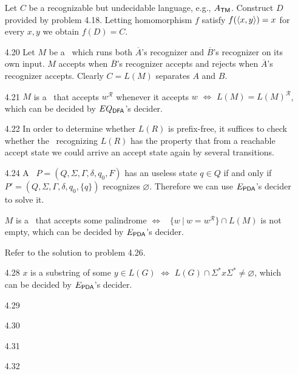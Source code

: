\begin{itemize}
	\item[\Star 4.19]
	Let $C$ be a recognizable but undecidable language, e.g., $A_{\TM}$. Construct $D$ provided by problem 4.18. Letting homomorphism $f$ satisfy $f(\Bra{x,y}) = x$ for every $x,y$ we obtain $f(D) = C$.
	
	\item[4.20]
	Let $M$ be a \TM \ which runs both $\overline{A}$'s recognizer and $\overline{B}$'s recognizer on its own input. $M$ accepts when $\overline{B}$'s recognizer accepts and rejects when $\overline{A}$'s recognizer accepts. Clearly $C = L(M)$ separates $A$ and $B$.
	
	\item[4.21]
	$M$ is a \DFA \ that accepts $w^\mathcal{R}$ whenever it accepts $w$ $\iff$ $L(M) = L(M)^\mathcal{R}$, which can be decided by $EQ_{\DFA}$'s decider.
	
	\item[4.22]
	In order to determine whether $L(R)$ is prefix-free, it suffices to check whether the \DFA \ recognizing $L(R)$ has the property that from a reachable accept state we could arrive an accept state again by several transitions.
	
	\item[\Star 4.23]
	\Omit
	
	\item[4.24]
	A \PDA \ $P = (Q, \Sigma, \Gamma, \delta, q_0, F)$ has an useless state $q \in Q$ if and only if \PDA \ $P' = (Q, \Sigma, \Gamma, \delta, q_0, \{q\})$ recognizes $\varnothing$. Therefore we can use $E_{\PDA}$'s decider to solve it.
	
	\item[\Star 4.25]
	\Omit
	
	\item[\Star 4.26] 
	$M$ is a \DFA \ that accepts some palindrome $\iff$ \CFL \ $\{ w \ | \ w = w^{\mathcal{R}} \} \cap L(M)$ is not empty, which can be decided by $E_{\PDA}$'s decider.
	
	\item[\Star 4.27] 
	Refer to the solution to problem 4.26.
	
	\item[4.28]
	$x$ is a substring of some $y \in L(G)$ $\iff$ $L(G) \cap \Sigma^* x \Sigma^* \neq \varnothing$, which can be decided by $E_{\PDA}$'s decider.
	
	\item[4.29]
	\Empty
	
	\item[4.30]
	\Empty		
	
	\item[4.31]
	\Empty
	
	\item[4.32]
	\Empty
	
\end{itemize}